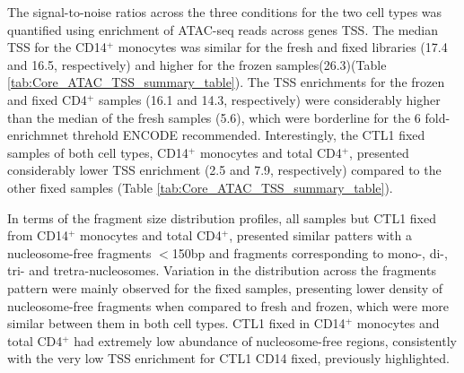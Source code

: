 The signal-to-noise ratios across the three conditions for the two cell types was quantified using enrichment of ATAC-seq reads across genes TSS. The median TSS for the CD14$^+$ monocytes was similar for the fresh and fixed libraries (17.4 and 16.5, respectively) and higher for the frozen samples(26.3)(Table \ref{tab:Core_ATAC_TSS_summary_table}). The TSS enrichments for the frozen and fixed CD4$^+$ samples (16.1 and 14.3, respectively) were considerably higher than the median of the fresh samples (5.6), which were borderline for the 6 fold-enrichmnet threhold ENCODE recommended. Interestingly, the CTL1 fixed samples of both cell types, CD14$^+$ monocytes and total CD4$^+$, presented  considerably lower TSS enrichment (2.5 and 7.9, respectively) compared to the other fixed samples (Table \ref{tab:Core_ATAC_TSS_summary_table}). 


In terms of the fragment size distribution profiles, all samples but CTL1 fixed from CD14$^+$ monocytes and total CD4$^+$, presented similar patters with a nucleosome-free fragments $<$150bp and fragments corresponding to mono-, di-, tri- and tretra-nucleosomes. Variation in the distribution across the fragments pattern were mainly observed for the fixed samples, presenting lower density of nucleosome-free fragments when compared to fresh and frozen, which were more similar between them in both cell types. CTL1 fixed in CD14$^+$ monocytes and total CD4$^+$ had extremely low abundance of nucleosome-free regions, consistently with the very low TSS enrichment for CTL1 CD14 fixed, previously highlighted. 

